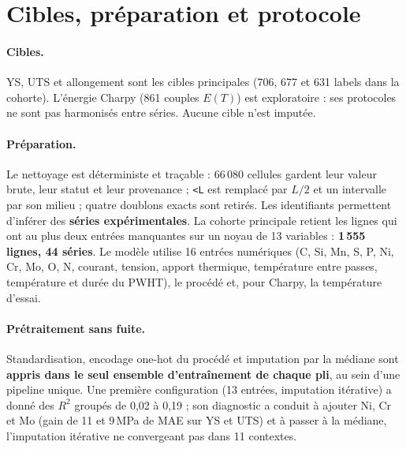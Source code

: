 \documentclass[11pt,a4paper]{article}
\begin{document}
\section{Cibles, préparation et protocole}
\label{sec:prep}

\paragraph{Cibles.} YS, UTS et allongement sont les cibles principales (706, 677
et 631 labels dans la cohorte). L'énergie Charpy (861 couples $E(T)$) est
exploratoire : ses protocoles ne sont pas harmonisés entre séries. Aucune cible
n'est imputée.

\paragraph{Préparation.} Le nettoyage est déterministe et traçable : 66\,080
cellules gardent leur valeur brute, leur statut et leur provenance ; \texttt{<L}
est remplacé par $L/2$ et un intervalle par son milieu ; quatre doublons exacts
sont retirés. Les identifiants permettent d'inférer des \textbf{séries
expérimentales}. La cohorte principale retient les lignes qui ont au plus deux
entrées manquantes sur un noyau de 13 variables : \textbf{1\,555 lignes, 44
séries}. Le modèle utilise 16 entrées numériques (C, Si, Mn, S, P, Ni, Cr, Mo,
O, N, courant, tension, apport thermique, température entre passes, température
et durée du PWHT), le procédé et, pour Charpy, la température d'essai.

\paragraph{Prétraitement sans fuite.} Standardisation, encodage one-hot du
procédé et imputation par la médiane sont \textbf{appris dans le seul ensemble
d'entraînement de chaque pli}, au sein d'une pipeline unique. Une première
configuration (13 entrées, imputation itérative) a donné des $R^2$ groupés de
0,02 à 0,19 ; son diagnostic a conduit à ajouter Ni, Cr et Mo (gain de 11 et
9\,MPa de MAE sur YS et UTS) et à passer à la médiane, l'imputation itérative ne
convergeant pas dans 11 contextes.
\end{document}
